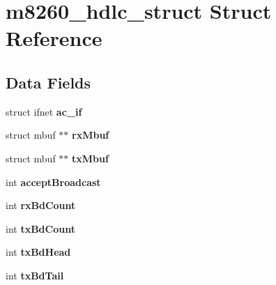 \hypertarget{structm8260__hdlc__struct}{}\section{m8260\+\_\+hdlc\+\_\+struct Struct Reference}
\label{structm8260__hdlc__struct}
\subsection*{Data Fields}
\begin{DoxyCompactItemize}
\item 
\mbox{\label{structm8260__hdlc__struct_a4fc66a5ab725ce8e39a44ffa7765bb57}} 
struct ifnet {\bfseries ac\+\_\+if}
\item 
\mbox{\label{structm8260__hdlc__struct_a4c8495f7f2487ac6bfa77696c558ea54}} 
struct mbuf $\ast$$\ast$ {\bfseries rx\+Mbuf}
\item 
\mbox{\label{structm8260__hdlc__struct_ac9c36cd4cd5eae448e5a6a92f42956de}} 
struct mbuf $\ast$$\ast$ {\bfseries tx\+Mbuf}
\item 
\mbox{\label{structm8260__hdlc__struct_a0bb6cfde0b140099b13532fd0693751d}} 
int {\bfseries accept\+Broadcast}
\item 
\mbox{\label{structm8260__hdlc__struct_a7286533ca386ec4bd6425a7c276c30e4}} 
int {\bfseries rx\+Bd\+Count}
\item 
\mbox{\label{structm8260__hdlc__struct_a2adf7d2aa897edd03692d141ef49a179}} 
int {\bfseries tx\+Bd\+Count}
\item 
\mbox{\label{structm8260__hdlc__struct_afcc4c98533386bda29f1e11ca73efe46}} 
int {\bfseries tx\+Bd\+Head}
\item 
\mbox{\label{structm8260__hdlc__struct_adddf2b1114f91684cf36660a86c1b4f3}} 
int {\bfseries tx\+Bd\+Tail}
\item 
\mbox{\label{structm8260__hdlc__struct_a74ca1c71f5779a1cdad27f58e56423c1}} 

\end{DoxyCompactItemize}
